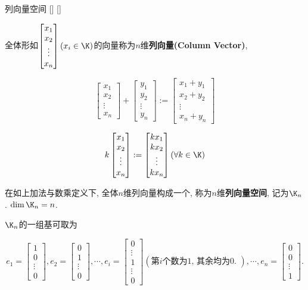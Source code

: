 \documentclass[UTF8]{ctexart}
\begin{document}
		\begin{xmp}
			[]
			{列向量空间}
			[]
			[]

			全体形如$\begin{bmatrix}x_1\\x_2\\\vdots\\x_n\end{bmatrix}(x_i\in\K)$的向量称为$n$维\textbf{列向量(Column Vector)}, 
			
			\[\begin{bmatrix}x_1\\x_2\\\vdots\\x_n\end{bmatrix}
			+\begin{bmatrix}y_1\\y_2\\\vdots\\y_n\end{bmatrix}
			:=
			\begin{bmatrix}x_1+y_1\\x_2+y_2\\\vdots\\x_n+y_n\end{bmatrix}\]
			
			\[k\begin{bmatrix}x_1\\x_2\\\vdots\\x_n\end{bmatrix}
			:=
			\begin{bmatrix}kx_1\\kx_2\\\vdots\\kx_n\end{bmatrix}(\forall k\in\K)\]
			
			在如上加法与数乘定义下, 全体$n$维列向量构成一个, 称为$n$维\textbf{列向量空间}, 记为$\K_n$. $\dim \K_n=n$. 
			
			$\K_n$的一组基可取为
			
			\[e_1=\begin{bmatrix}1\\0\\\vdots\\0\end{bmatrix},
			e_2=\begin{bmatrix}0\\1\\\vdots\\0\end{bmatrix},
			\cdots, 
			e_i=\begin{bmatrix}0\\\vdots\\1\\\vdots\\0\end{bmatrix}(\mbox{第$i$个数为$1$, 其余均为$0$. }), 
			\cdots, 
			e_n=\begin{bmatrix}0\\0\\\vdots\\1\end{bmatrix}. \]
			

\end{xmp}
\end{document}
